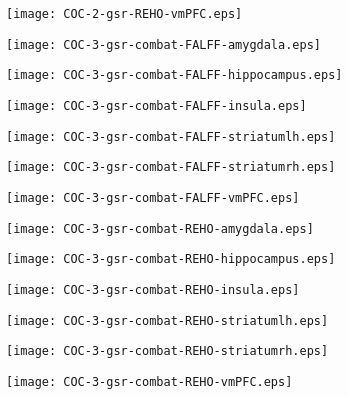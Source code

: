 \documentclass{article}
\begin{document}

\newpage
\texttt{[image: COC-2-gsr-REHO-vmPFC.eps]}

\newpage
\texttt{[image: COC-3-gsr-combat-FALFF-amygdala.eps]}

\newpage
\texttt{[image: COC-3-gsr-combat-FALFF-hippocampus.eps]}

\newpage
\texttt{[image: COC-3-gsr-combat-FALFF-insula.eps]}

\newpage
\texttt{[image: COC-3-gsr-combat-FALFF-striatumlh.eps]}

\newpage
\texttt{[image: COC-3-gsr-combat-FALFF-striatumrh.eps]}

\newpage
\texttt{[image: COC-3-gsr-combat-FALFF-vmPFC.eps]}

\newpage
\texttt{[image: COC-3-gsr-combat-REHO-amygdala.eps]}

\newpage
\texttt{[image: COC-3-gsr-combat-REHO-hippocampus.eps]}

\newpage
\texttt{[image: COC-3-gsr-combat-REHO-insula.eps]}

\newpage
\texttt{[image: COC-3-gsr-combat-REHO-striatumlh.eps]}

\newpage
\texttt{[image: COC-3-gsr-combat-REHO-striatumrh.eps]}

\newpage
\texttt{[image: COC-3-gsr-combat-REHO-vmPFC.eps]}

\newpage

%
\end{document}
